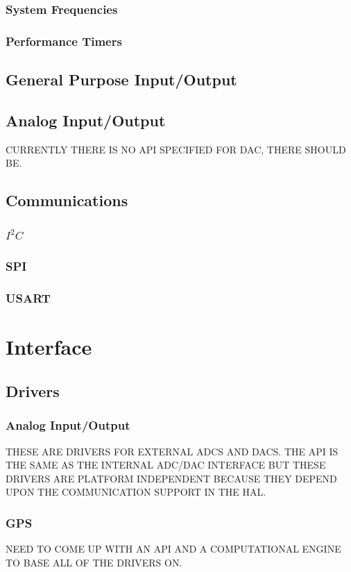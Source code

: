 \documentclass[10pt,letterpaper]{memoir} %
\newcommand{\iic}[0]{$I^{2}C$}
\begin{document}
\subsubsection{System Frequencies}
\subsubsection{Performance Timers}

\subsection{General Purpose Input/Output}
\subsection{Analog Input/Output}
CURRENTLY THERE IS NO API SPECIFIED FOR DAC, THERE SHOULD BE.

\subsection{Communications}
\subsubsection{\iic}
\subsubsection{SPI}
\subsubsection{USART}

\section{Interface}
\subsection{Drivers}
\subsubsection{Analog Input/Output}
THESE ARE DRIVERS FOR EXTERNAL ADCS AND DACS.  THE API IS THE SAME AS THE INTERNAL ADC/DAC INTERFACE BUT THESE DRIVERS ARE PLATFORM INDEPENDENT BECAUSE THEY DEPEND UPON THE COMMUNICATION SUPPORT IN THE HAL.
\subsubsection{GPS}
NEED TO COME UP WITH AN API AND A COMPUTATIONAL ENGINE TO BASE ALL OF THE DRIVERS ON.
\end{document}
